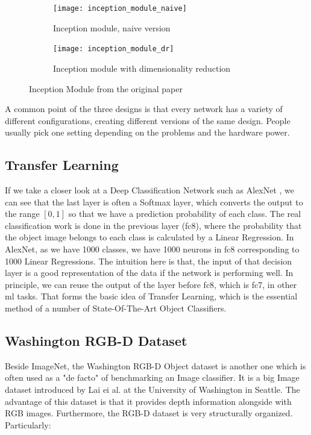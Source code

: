 \begin{figure}[h!]
	\centering
	\begin{subfigure}{0.7\textwidth}
		\texttt{[image: inception\_module\_naive]}
		\caption{Inception module, naive version}
	\end{subfigure}
	\begin{subfigure}{0.7\textwidth}
		\texttt{[image: inception\_module\_dr]}
		\caption{Inception module with dimensionality reduction}
	\end{subfigure}
	
	\caption{Inception Module from the original paper \cite{inception1}}
	\label{fig:inception_module}
\end{figure}

A common point of the three designs is that every network has a variety of different
configurations, creating different versions of the same design. People usually pick one
setting depending on the problems and the hardware power.

\subsection{Transfer Learning}

If we take a closer look at a Deep Classification Network such as AlexNet \cite{alexnet},
we can see that the last layer is often a Softmax layer, which converts the output to the
range $[0, 1]$ so that we have a prediction probability of each class. The real
classification work is done in the previous layer (fc8), where the probability that the
object image belongs to each class is calculated by a Linear Regression. In AlexNet, as we
have 1000 classes, we have 1000 neurons in fc8 corresponding to 1000 Linear Regressions.
The intuition here is that, the input of that decision layer is a good representation of
the data if the network is performing well. In principle, we can reuse the output of the
layer before fc8, which is fc7, in other \acrshort{ml} tasks.  That forms the basic idea
of Transfer Learning, which is the essential method of a number of State-Of-The-Art Object
Classifiers.

\subsection{Washington RGB-D Dataset}
\label{subsec:washington_dataset}

Beside ImageNet, the Washington RGB-D Object dataset is another one which is often used as
a "de facto" of benchmarking an Image classifier.  It is a big Image dataset introduced by
Lai ei al. \cite{washington_rgbd} at the University of Washington in Seattle. The
advantage of this dataset is that it provides depth information alongside with RGB images.
Furthermore, the RGB-D dataset is very structurally organized. Particularly:

